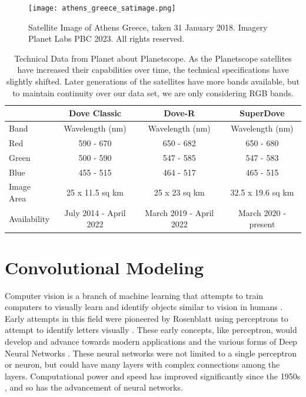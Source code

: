 \begin{figure}
    \centering
    \texttt{[image: athens\_greece\_satimage.png]}
    \caption{Satellite Image of Athens Greece, taken 31 January 2018. Imagery \textcopyright Planet Labs PBC 2023. All rights reserved.}
    \label{fig:athens_baseimage_ch2}
\end{figure}

\begin{table}
    \centering
    \begin{tabular}{|l|c|c|c|}
        \hline
            & \textbf{Dove Classic} & \textbf{Dove-R} & \textbf{SuperDove}\\
            \hline
         Band  & Wavelength (nm) & Wavelength (nm) & Wavelength (nm) \\
         \hline
         Red   & 590 - 670       & 650 - 682       & 650 - 680\\
         Green & 500 - 590       & 547 - 585       & 547 - 583\\
         Blue  & 455 - 515       & 464 - 517       & 465 - 515\\
         \hline\hline
         Image Area &  25 x 11.5 sq km & 25 x 23 sq km &32.5 x 19.6 sq km\\ \hline
         Availability & July 2014 - April 2022 & March 2019 - April 2022 & March 2020 - present \\ \hline
         
    \end{tabular}
    \caption{Technical Data from Planet about Planetscope\citep{planetScope}. As the Planetscope satellites have increased their capabilities over time, the technical specifications have slightly shifted.  Later generations of the satellites have more bands available, but to maintain continuity over our data set, we are only considering RGB bands. }
    \label{tab:planetscope_ch2}
\end{table}

\section{Convolutional Modeling}
Computer vision is a branch of machine learning that attempts to train computers to visually learn and identify objects similar to vision in humans \citep{goodfellow2016deep}.  Early attempts in this field were pioneered by Rosenblatt using perceptrons to attempt to identify letters visually \citep{rosenblatt1957perceptron}.  These early concepts, like perceptron, would develop and advance towards modern applications and the various forms of Deep Neural Networks \citep{fradkov2020early}.  These neural networks were not limited to a single perceptron or neuron, but could have many layers with complex connections among the layers.  Computational power and speed has improved significantly since the 1950s \citep{nordhaus2001progress}, and so has the advancement of neural networks.  

